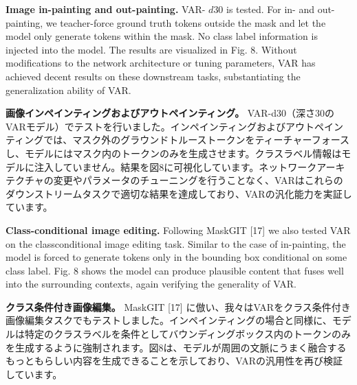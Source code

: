 \documentclass{article}
\begin{document}
\textbf{Image in-painting and out-painting.} VAR- $d 30$ is tested. For in- and out-painting, we teacher-force ground truth tokens outside the mask and let the model only generate tokens within the mask. No class label information is injected into the model. The results are visualized in Fig. 8. Without modifications to the network architecture or tuning parameters, VAR has achieved decent results on these downstream tasks, substantiating the generalization ability of VAR.

\textbf{画像インペインティングおよびアウトペインティング。} VAR-d30（深さ30のVARモデル）でテストを行いました。インペインティングおよびアウトペインティングでは、マスク外のグラウンドトルーストークンをティーチャーフォースし、モデルにはマスク内のトークンのみを生成させます。クラスラベル情報はモデルに注入していません。結果を図8に可視化しています。ネットワークアーキテクチャの変更やパラメータのチューニングを行うことなく、VARはこれらのダウンストリームタスクで適切な結果を達成しており、VARの汎化能力を実証しています。

\textbf{Class-conditional image editing.} Following MaskGIT [17] we also tested VAR on the classconditional image editing task. Similar to the case of in-painting, the model is forced to generate tokens only in the bounding box conditional on some class label. Fig. 8 shows the model can produce plausible content that fuses well into the surrounding contexts, again verifying the generality of VAR.

\textbf{クラス条件付き画像編集。} MaskGIT [17] に倣い、我々はVARをクラス条件付き画像編集タスクでもテストしました。インペインティングの場合と同様に、モデルは特定のクラスラベルを条件としてバウンディングボックス内のトークンのみを生成するように強制されます。図8は、モデルが周囲の文脈にうまく融合するもっともらしい内容を生成できることを示しており、VARの汎用性を再び検証しています。
\end{document}
